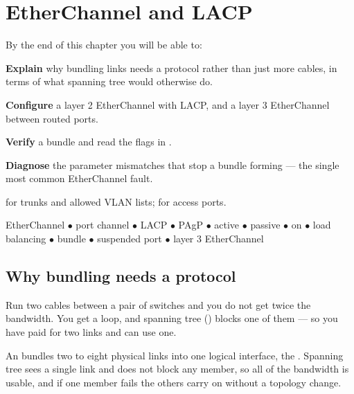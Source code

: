 \chapter{EtherChannel and LACP}\label{ch:etherchannel}

\begin{outcomes}
By the end of this chapter you will be able to:
\begin{tight}
  \item \textbf{Explain} why bundling links needs a protocol rather than just
        more cables, in terms of what spanning tree would otherwise do.
  \item \textbf{Configure} a layer 2 EtherChannel with LACP, and a layer 3
        EtherChannel between routed ports.
  \item \textbf{Verify} a bundle and read the flags in .
  \item \textbf{Diagnose} the parameter mismatches that stop a bundle forming ---
        the single most common EtherChannel fault.
\end{tight}
\end{outcomes}

\begin{prereq}
 for trunks and allowed VLAN lists;  for access
ports.
\end{prereq}

\begin{keyterms}
EtherChannel $\bullet$ port channel $\bullet$ LACP $\bullet$ PAgP $\bullet$
active $\bullet$ passive $\bullet$ on $\bullet$ load balancing $\bullet$
bundle $\bullet$ suspended port $\bullet$ layer 3 EtherChannel
\end{keyterms}

\section{Why bundling needs a protocol}

Run two cables between a pair of switches and you do not get twice the bandwidth.
You get a loop, and spanning tree () blocks one of them --- so you
have paid for two links and can use one.

\begin{definitionbox}[EtherChannel]
An  bundles two to eight physical links into one logical
interface, the . Spanning tree sees a single link and does not
block any member, so all of the bandwidth is usable, and if one member fails the
others carry on without a topology change.
\end{definitionbox}

